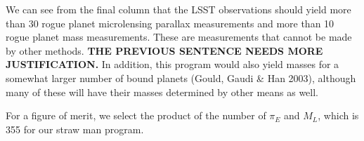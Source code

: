 We can see from the final column that the LSST observations should
yield more than 30 rogue planet microlensing parallax measurements and
more than 10 rogue planet mass measurements. These are measurements
that cannot be made by other methods. 
\textbf{THE PREVIOUS SENTENCE NEEDS MORE JUSTIFICATION.}
In addition, this program would
also yield masses for a somewhat larger number of bound planets
(Gould, Gaudi \& Han 2003), although many of these will have their
masses determined by other means as well.

For a figure of merit, we select the product of the number of $\pi_E$
and $M_L$, which is 355 for our straw man program.


%
%
%
%
%
%
%
%

\navigationbar
